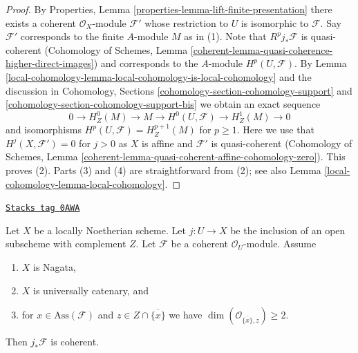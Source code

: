 \begin{proof}
By Properties, Lemma \ref{properties-lemma-lift-finite-presentation}
there exists a coherent $\mathcal{O}_X$-module $\mathcal{F}'$
whose restriction to $U$ is isomorphic to $\mathcal{F}$.
Say $\mathcal{F}'$ corresponds to the finite $A$-module $M$
as in (1).
Note that $R^pj_*\mathcal{F}$ is quasi-coherent
(Cohomology of Schemes, Lemma
\ref{coherent-lemma-quasi-coherence-higher-direct-images})
and corresponds to the $A$-module $H^p(U, \mathcal{F})$.
By Lemma \ref{local-cohomology-lemma-local-cohomology-is-local-cohomology}
and the discussion in
Cohomology, Sections \ref{cohomology-section-cohomology-support} and
\ref{cohomology-section-cohomology-support-bis}
we obtain an exact sequence
$$
0 \to H^0_Z(M) \to M \to H^0(U, \mathcal{F}) \to H^1_Z(M) \to 0
$$
and isomorphisms $H^p(U, \mathcal{F}) = H^{p + 1}_Z(M)$ for $p \geq 1$.
Here we use that $H^j(X, \mathcal{F}') = 0$ for $j > 0$ as $X$ is affine
and $\mathcal{F}'$ is quasi-coherent (Cohomology of Schemes,
Lemma \ref{coherent-lemma-quasi-coherent-affine-cohomology-zero}).
This proves (2).
Parts (3) and (4) are straightforward from (2); see also
Lemma \ref{local-cohomology-lemma-local-cohomology}.
\end{proof}

\begin{lemma}
\label{local-cohomology-lemma-finiteness-pushforward}
\href{https://stacks.math.columbia.edu/tag/0AWA}{\texttt{Stacks tag 0AWA}}

Let $X$ be a locally Noetherian scheme.
Let $j : U \to X$ be the inclusion of an
open subscheme with complement $Z$. Let $\mathcal{F}$ be a coherent
$\mathcal{O}_U$-module. Assume
\begin{enumerate}
\item $X$ is Nagata,
\item $X$ is universally catenary, and
\item for $x \in \text{Ass}(\mathcal{F})$ and
$z \in Z \cap \overline{\{x\}}$ we have
$\dim(\mathcal{O}_{\overline{\{x\}}, z}) \geq 2$.
\end{enumerate}
Then $j_*\mathcal{F}$ is coherent.
\end{lemma}

